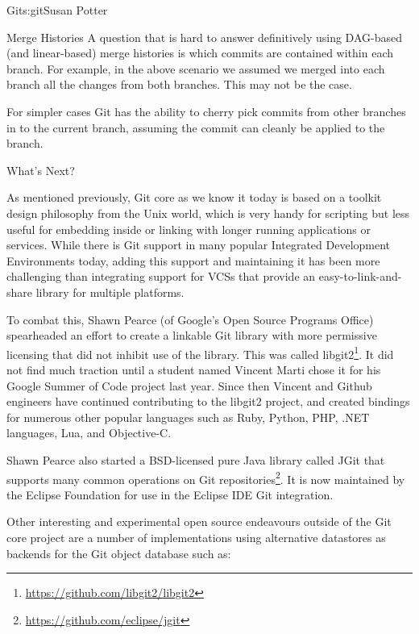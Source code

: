 \begin{aosachapter}{Git}{s:git}{Susan Potter}
\begin{aosasect1}{Merge Histories}
A question that is hard to answer definitively using DAG-based (and linear-based) 
merge histories is which commits are contained within each branch. For
example, in the above scenario we assumed we merged into each branch all
the changes from both branches. This may not be the case.

For simpler cases Git has the ability to cherry pick commits from
other branches in to the current branch, assuming the commit can cleanly
be applied to the branch.

\end{aosasect1}

\begin{aosasect1}{What's Next?}

As mentioned previously, Git core as we know it today is based on a toolkit
design philosophy from the Unix world, which is very handy for scripting
but less useful for embedding inside or linking with longer running
applications or services. While there is Git support in many popular
Integrated Development Environments today, adding this support and
maintaining it has been more challenging than integrating support for VCSs
that provide an easy-to-link-and-share library for multiple platforms.

To combat this, Shawn Pearce (of Google's Open Source Programs Office)
spearheaded an effort to create a linkable Git library with more permissive
licensing that did not inhibit use of the library. This was called 
libgit2\footnote{\url{https://github.com/libgit2/libgit2}}.
It did not find much traction until a student named Vincent Marti chose it
for his Google Summer of Code project last year. Since then Vincent and
Github engineers have continued contributing to the libgit2 project, and
created bindings for numerous other popular languages such as Ruby, Python,
PHP, .NET languages, Lua, and Objective-C.

Shawn Pearce also started a BSD-licensed pure Java library called JGit that
supports many common operations on Git 
repositories\footnote{\url{https://github.com/eclipse/jgit}}. It is now maintained by
the Eclipse Foundation for use in the Eclipse IDE Git integration.

Other interesting and experimental open source endeavours outside of the
Git core project are a number of implementations using alternative datastores
as backends for the Git object database such as:


\end{aosasect1}
\end{aosachapter}
